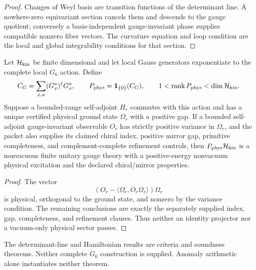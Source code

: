 \begin{proof}
Changes of Weyl basis are transition functions of the determinant line. A
nowhere-zero equivariant section cancels them and descends to the gauge
quotient; conversely a basis-independent gauge-invariant phase supplies
compatible nonzero fiber vectors. The curvature equation and loop condition
are the local and global integrability conditions for that section.
\end{proof}

\begin{theorem}
\label{thm:qft-q2h-hamiltonian-soundness}
Let \(\mathcal H_{\rm kin}\) be finite dimensional and let local Gauss
generators exponentiate to the complete local \(G_6\) action. Define
\[
C_G=\sum_{x,a}(G_x^a)^\dagger G_x^a,\qquad
P_{\rm phys}=\mathbf1_{\{0\}}(C_G),
\qquad
1<\operatorname{rank}P_{\rm phys}<\dim\mathcal H_{\rm kin}.
\]
Suppose a bounded-range self-adjoint \(H_r\) commutes with this action and has
a unique certified physical ground state \(\Omega_r\) with a positive gap.
If a bounded self-adjoint gauge-invariant observable \(O_r\) has strictly
positive variance in \(\Omega_r\), and the packet also supplies its claimed
chiral index, positive mirror gap, primitive completeness, and
complement-complete refinement controls, then
\(P_{\rm phys}\mathcal H_{\rm kin}\) is a nonvacuous finite unitary gauge
theory with a positive-energy nonvacuum physical excitation and the declared
chiral/mirror properties.
\end{theorem}

\begin{proof}
The vector
\[
(O_r-\langle\Omega_r,O_r\Omega_r\rangle)\Omega_r
\]
is physical, orthogonal to the ground state, and nonzero by the variance
condition. The remaining conclusions are exactly the separately supplied
index, gap, completeness, and refinement clauses. Thus neither an identity
projector nor a vacuum-only physical sector passes.
\end{proof}

\begin{remark}
The determinant-line and Hamiltonian results are criteria and soundness
theorems. Neither complete \(G_6\) construction is supplied. Anomaly
arithmetic alone instantiates neither theorem.
\end{remark}

